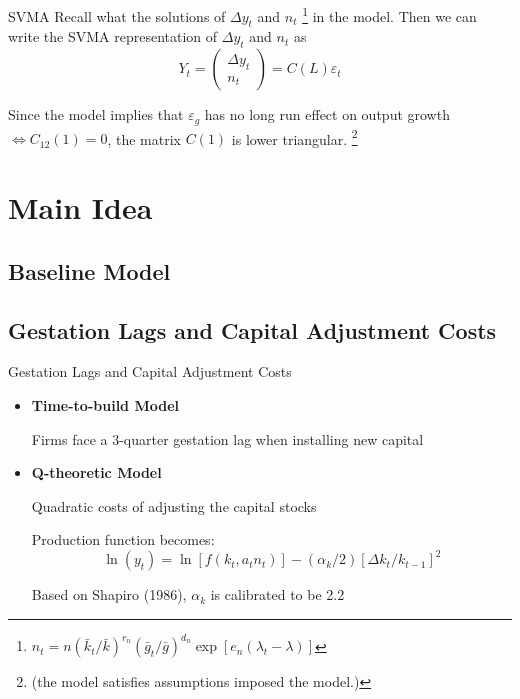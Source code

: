 \documentclass[10pt]{beamer}
\begin{document}
\begin{frame}{SVMA}
    Recall what the solutions of $\Delta y_t$ and $n_t$  \footnote{$n_{t}=n\left(\bar{k}_{t} / \bar{k}\right)^{r_{n}}\left(\bar{g}_{t} / \bar{g}\right)^{d_{n}} \exp \left[e_{n}\left(\lambda_{t}-\lambda\right)\right]$}
    in the \cite{christiano_eichenbaum_2020} model.
    Then we can write the SVMA representation of $\Delta y_t$ and $n_t$ as
    \begin{equation}
        Y_t = \begin{pmatrix}
            \Delta y_t \\ n_t
        \end{pmatrix}=C(L)\varepsilon_t
    \end{equation}
\end{frame}
Since the model implies that $\varepsilon_g$ has no long run effect on output growth $ \Leftrightarrow C_{12}(1)=0$, the matrix $C(1)$ is lower triangular. \footnote{(the model satisfies assumptions imposed  the \cite{blanchard_quah_1988} model.)}

\section{Main Idea}
\subsection{Baseline Model}

\subsection{Gestation Lags and Capital Adjustment Costs}

\begin{frame}{Gestation Lags and Capital Adjustment Costs}

    \begin{itemize}
        \item \textbf{Time-to-build Model}

              Firms face a 3-quarter gestation lag when installing new capital

        \item \textbf{Q-theoretic Model}

              Quadratic costs of adjusting the capital stocks

              Production function becomes: $$ \ln \left(y_t\right)= \ln \left[f\left(k_t, a_t
                      n_t\right)\right] -\left(\alpha_{k} / 2\right)\left[\Delta k_t /
                      k_{t-1}\right]^2 $$

              Based on Shapiro (1986), $\alpha_{k}$ is calibrated to be 2.2
    \end{itemize}

\end{frame}
\end{document}

